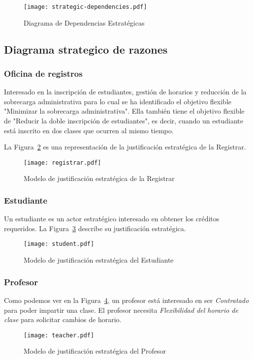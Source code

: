 \begin{figure}
	\caption{Diagrama de Dependencias Estratégicas}\label{fig:strategicDependenciesDiagram}
	\centering
	\texttt{[image: strategic-dependencies.pdf]}
\end{figure}

\subsection*{Diagrama strategico de razones}
\subsubsection*{Oficina de registros}
Interesado en la inscripción de estudiantes, gestión de horarios y reducción de la sobrecarga administrativa para lo cual se ha identificado el objetivo flexible "Minimizar la sobrecarga administrativa".
Ella también tiene el objetivo flexible de "Reducir la doble inscripción de estudiantes", es decir, cuando un estudiante está inscrito en dos clases que ocurren al mismo tiempo.

La Figura~\ref{fig:actorBoundaryRegistrar} es una representación de la justificación estratégica de la Registrar.

\begin{landscape}
	\begin{figure}
		\centering
		\caption{Modelo de justificación estratégica de la Registrar}
		\texttt{[image: registrar.pdf]}
		\label{fig:actorBoundaryRegistrar}
	\end{figure}
\end{landscape}

\subsubsection*{Estudiante}
Un estudiante es un actor estratégico interesado en obtener los créditos requeridos.
La Figura~\ref{fig:actorBoundaryStudent} describe su justificación estratégica.
\begin{figure}
	\centering
	\caption{Modelo de justificación estratégica del Estudiante}
	\texttt{[image: student.pdf]}
	\label{fig:actorBoundaryStudent}
\end{figure}

\subsubsection*{Profesor}
Como podemos ver en la Figura~\ref{fig:actorBoundaryTeacher}, un profesor está interesado en ser \textit{Contratado} para poder impartir una clase.
El profesor necesita \textit{Flexibilidad del horario de clase} para solicitar cambios de horario.

\begin{figure}
	\centering
	\caption{Modelo de justificación estratégica del Profesor}
	\label{fig:actorBoundaryTeacher}
	\texttt{[image: teacher.pdf]}
\end{figure}
